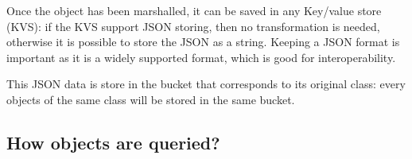 Once the object has been marshalled, it can be saved in any Key/value store
(KVS): if the KVS support JSON storing, then no transformation is needed,
otherwise it is possible to store the JSON as a string. Keeping a JSON format is
important as it is a widely supported format, which is good for 
interoperability.

This JSON data is store in the bucket that corresponds to its original class:
every objects of the same class will be stored in the same bucket.

\subsection{How objects are queried?}


